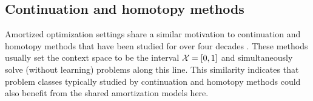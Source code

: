 \documentclass[twoside,11pt]{article}
\begin{document}
\subsection{Continuation and homotopy methods}
Amortized optimization settings share a similar motivation to
continuation and homotopy methods that have been studied for
over four decades
\citep{richter1983continuation,watson1989modern,allgower2012numerical}.
These methods usually set the context space to be the
interval ${\mathcal{X}}=[0,1]$ and simultaneously solve (without learning)
problems along this line.
This similarity indicates that problem classes typically
studied by continuation and homotopy methods could also benefit
from the shared amortization models here.



{\footnotesize}
\end{document}
